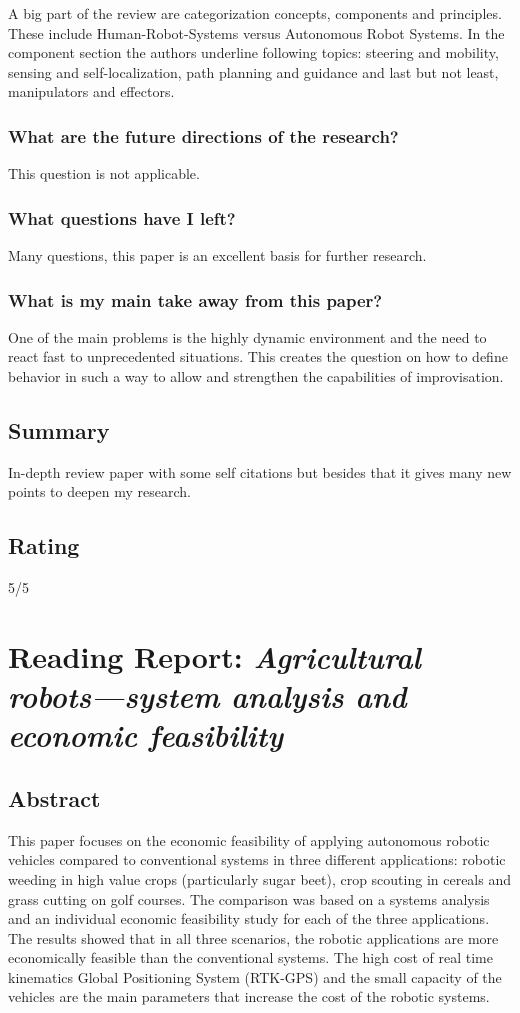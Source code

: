     A big part of the review are categorization concepts, components and principles. These include Human-Robot-Systems versus
    Autonomous Robot Systems. In the component section the authors underline following topics: steering and mobility, 
    sensing and self-localization, path planning and guidance and last but not least, manipulators and effectors.
    \subsubsection*{What are the future directions of the research?}
    This question is not applicable.
    \subsubsection*{What questions have I left?}
    Many questions, this paper is an excellent basis for further research.
    \subsubsection*{What is my main take away from this paper?}
    One of the main problems is the highly dynamic environment and the need to react fast to unprecedented situations.
    This creates the question on how to define behavior in such a way to allow and strengthen the capabilities of 
    improvisation.
    \subsection*{Summary}
    In-depth review paper with some self citations but besides that it gives many new points to deepen my research.
    
    \subsection*{Rating}
    5/5
    
    
    \newpage
    \section{Reading Report: \emph{Agricultural robots—system analysis and economic feasibility}}
    \cite{Pedersen2006}
    
    \subsection*{Abstract}
    This  paper focuses  on  the  economic  feasibility of  applying  autonomous robotic  vehicles  compared  to  conventional  systems  in  three  different  applications: robotic weeding in high value crops (particularly sugar beet), crop scouting in cereals and grass cutting on golf courses. The comparison was based on a systems analysis and an individual economic feasibility study for each of the three applications. The results  showed  that  in  all  three  scenarios,  the  robotic  applications  are  more  economically feasible than the conventional systems. The high cost of real time kinematics Global Positioning System (RTK-GPS) and the small capacity of the vehicles are the main parameters that increase the cost of the robotic systems.
    
